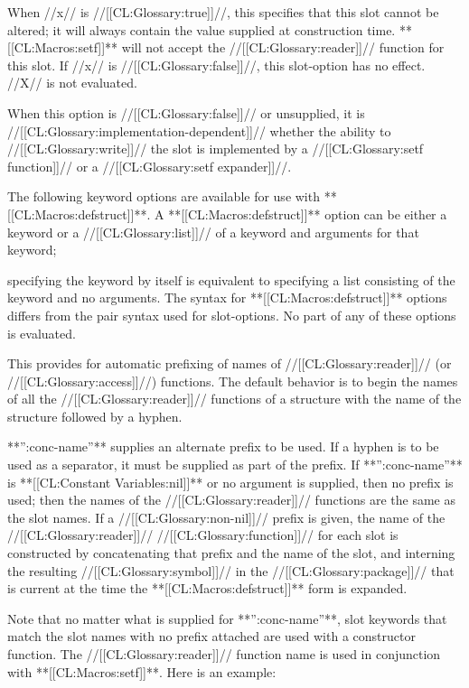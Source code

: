 When //x// is //[[CL:Glossary:true]]//, this specifies that this slot cannot be altered; it will always contain the value supplied at construction time. **[[CL:Macros:setf]]** will not accept the //[[CL:Glossary:reader]]// function for this slot. If //x// is //[[CL:Glossary:false]]//, this slot-option has no effect. //X// is not evaluated.

When this option is //[[CL:Glossary:false]]// or unsupplied, it is //[[CL:Glossary:implementation-dependent]]// whether the ability to //[[CL:Glossary:write]]// the slot is implemented by a //[[CL:Glossary:setf function]]// or a //[[CL:Glossary:setf expander]]//.

\endlist

The following keyword options are available for use with **[[CL:Macros:defstruct]]**. A **[[CL:Macros:defstruct]]** option can be either a keyword or a //[[CL:Glossary:list]]// of a keyword and arguments for that keyword;

specifying the keyword by itself is equivalent to specifying a list consisting of the keyword and no arguments. The syntax for **[[CL:Macros:defstruct]]** options differs from the pair syntax used for slot-options. No part of any of these options is evaluated. \beginlist


This provides for automatic prefixing of names of //[[CL:Glossary:reader]]// (or //[[CL:Glossary:access]]//) functions. The default behavior is to begin the names of all the //[[CL:Glossary:reader]]// functions of a structure with the name of the structure followed by a hyphen.

**'':conc-name''** supplies an alternate prefix to be used. If a hyphen is to be used as a separator, it must be supplied as part of the prefix. If **'':conc-name''** is **[[CL:Constant Variables:nil]]** or no argument is supplied, then no prefix is used; then the names of the //[[CL:Glossary:reader]]// functions are the same as the slot names. If a //[[CL:Glossary:non-nil]]// prefix is given, the name of the //[[CL:Glossary:reader]]// //[[CL:Glossary:function]]// for each slot is constructed by concatenating that prefix and the name of the slot, and interning the resulting //[[CL:Glossary:symbol]]// in the //[[CL:Glossary:package]]// that is current at the time the **[[CL:Macros:defstruct]]** form is expanded.

Note that no matter what is supplied for **'':conc-name''**, slot keywords that match the slot names with no prefix attached are used with a constructor function. The //[[CL:Glossary:reader]]// function name is used in conjunction with **[[CL:Macros:setf]]**. Here is an example:

